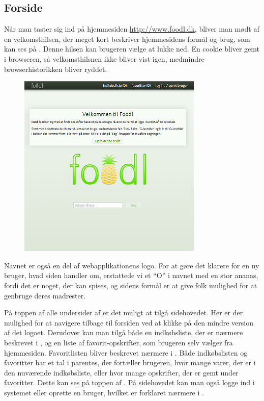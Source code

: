 \subsection{Forside}
\label{subsec:brug-forside}

Når man taster sig ind på hjemmesiden \url{http://www.foodl.dk}, bliver man mødt af en velkomsthilsen, der meget kort beskriver hjemmesidens formål og brug, som kan ses på . Denne hilsen kan brugeren vælge at lukke ned. En cookie bliver gemt i browseren, så velkomsthilsnen ikke bliver vist igen, medmindre browserhistorikken bliver ryddet.

\begin{figure}[H]
	\centering
	\includegraphics[scale=1]{billeder/foodl/thumbnails/forside.png}
	\label{fig:overblik-forside}
\end{figure}

Navnet \Foodl{} er også en del af webapplikationens logo. For at gøre det klarere for en ny bruger, hvad siden handler om, erstattede vi et ``O'' i navnet med en stor ananas, fordi det er noget, der kan spises, og sidens formål er at give folk mulighed for at genbruge deres madrester. 

På toppen af alle undersider af \Foodl{} er det muligt at tilgå sidehovedet. Her er der mulighed for at navigere tilbage til forsiden ved at klikke på den mindre version af det logoet. Derudover kan man tilgå både en indkøbsliste, der er nærmere beskrevet i , og en liste af favorit-opskrifter, som brugeren selv vælger fra hjemmesiden. Favoritlisten bliver beskrevet nærmere i . Både indkøbslisten og favoritter har et tal i parentes, der fortæller brugeren, hvor mange varer, der er i den nuværende indkøbsliste, eller hvor mange opskrifter, der er gemt under favoritter. Dette kan ses på toppen af . På sidehovedet kan man også logge ind i systemet eller oprette en bruger, hvilket er forklaret nærmere i .

